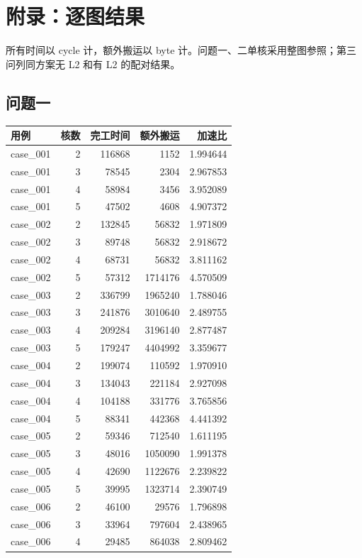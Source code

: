 \section*{附录：逐图结果}
所有时间以 cycle 计，额外搬运以 byte 计。问题一、二单核采用整图参照；第三问列同方案无 L2 和有 L2 的配对结果。
\subsection*{问题一}
\begin{longtable}{lrrrr}
用例 & 核数 & 完工时间 & 额外搬运 & 加速比 \\ \hline
\endhead
case\_001 & 2 & 116868 & 1152 & 1.994644 \\
case\_001 & 3 & 78545 & 2304 & 2.967853 \\
case\_001 & 4 & 58984 & 3456 & 3.952089 \\
case\_001 & 5 & 47502 & 4608 & 4.907372 \\
case\_002 & 2 & 132845 & 56832 & 1.971809 \\
case\_002 & 3 & 89748 & 56832 & 2.918672 \\
case\_002 & 4 & 68731 & 56832 & 3.811162 \\
case\_002 & 5 & 57312 & 1714176 & 4.570509 \\
case\_003 & 2 & 336799 & 1965240 & 1.788046 \\
case\_003 & 3 & 241876 & 3010640 & 2.489755 \\
case\_003 & 4 & 209284 & 3196140 & 2.877487 \\
case\_003 & 5 & 179247 & 4404992 & 3.359677 \\
case\_004 & 2 & 199074 & 110592 & 1.970910 \\
case\_004 & 3 & 134043 & 221184 & 2.927098 \\
case\_004 & 4 & 104188 & 331776 & 3.765856 \\
case\_004 & 5 & 88341 & 442368 & 4.441392 \\
case\_005 & 2 & 59346 & 712540 & 1.611195 \\
case\_005 & 3 & 48016 & 1050090 & 1.991378 \\
case\_005 & 4 & 42690 & 1122676 & 2.239822 \\
case\_005 & 5 & 39995 & 1323714 & 2.390749 \\
case\_006 & 2 & 46100 & 29576 & 1.796898 \\
case\_006 & 3 & 33964 & 797604 & 2.438965 \\
case\_006 & 4 & 29485 & 864038 & 2.809462 \\

\end{longtable}
